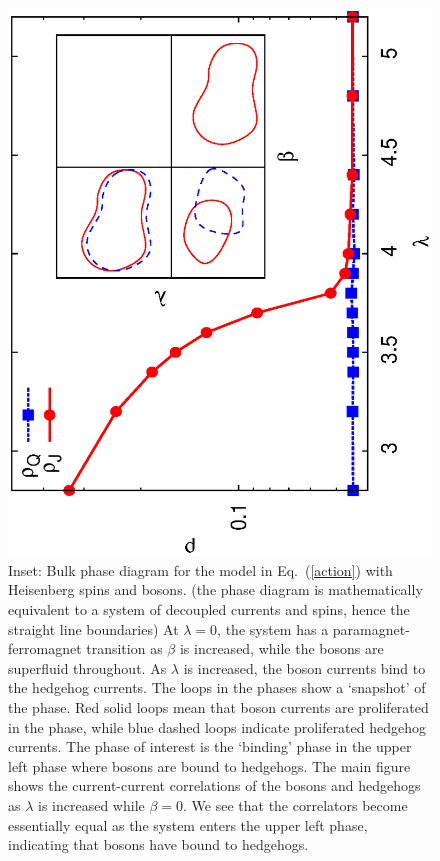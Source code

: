 \documentclass[prb,twocolumn]{revtex4-1}
\begin{document}
\begin{figure}
\includegraphics[angle=-90,width=\linewidth]{figures/heisbulkout.eps}
\caption{Inset: Bulk phase diagram for the model in Eq.~(\ref{action}) with Heisenberg spins and bosons. (the phase diagram is mathematically equivalent to a system of decoupled currents and spins, hence the straight line boundaries) At $\lambda=0$, the system has a paramagnet-ferromagnet transition as $\beta$ is increased, while the bosons are superfluid throughout. As $\lambda$ is increased, the boson currents bind to the hedgehog currents. The loops in the phases show a `snapshot' of the phase. Red solid loops mean that boson currents are proliferated in the phase, while blue dashed loops indicate proliferated hedgehog currents. The phase of interest is the `binding' phase in the upper left phase where bosons are bound to hedgehogs. The main figure shows the current-current correlations of the bosons and hedgehogs as $\lambda$ is increased while $\beta=0$. We see that the correlators become essentially equal as the system enters the upper left phase, indicating that bosons have bound to hedgehogs.}
\label{heisbulk}
\end{figure}
\end{document}
